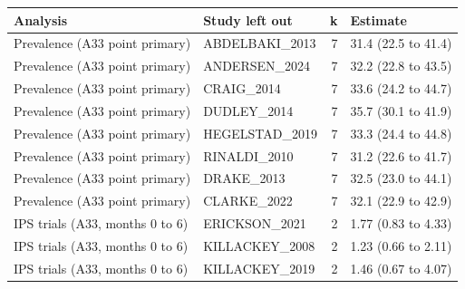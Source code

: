
\begin{tabular}{llrl}
\toprule
Analysis & Study left out & k & Estimate\\
\midrule
Prevalence (A33 point primary) & ABDELBAKI\_2013 & 7 & 31.4 (22.5 to 41.4)\\
Prevalence (A33 point primary) & ANDERSEN\_2024 & 7 & 32.2 (22.8 to 43.5)\\
Prevalence (A33 point primary) & CRAIG\_2014 & 7 & 33.6 (24.2 to 44.7)\\
Prevalence (A33 point primary) & DUDLEY\_2014 & 7 & 35.7 (30.1 to 41.9)\\
Prevalence (A33 point primary) & HEGELSTAD\_2019 & 7 & 33.3 (24.4 to 44.8)\\
Prevalence (A33 point primary) & RINALDI\_2010 & 7 & 31.2 (22.6 to 41.7)\\
Prevalence (A33 point primary) & DRAKE\_2013 & 7 & 32.5 (23.0 to 44.1)\\
Prevalence (A33 point primary) & CLARKE\_2022 & 7 & 32.1 (22.9 to 42.9)\\
IPS trials (A33, months 0 to 6) & ERICKSON\_2021 & 2 & 1.77 (0.83 to 4.33)\\
IPS trials (A33, months 0 to 6) & KILLACKEY\_2008 & 2 & 1.23 (0.66 to 2.11)\\
IPS trials (A33, months 0 to 6) & KILLACKEY\_2019 & 2 & 1.46 (0.67 to 4.07)\\
\bottomrule
\end{tabular}
